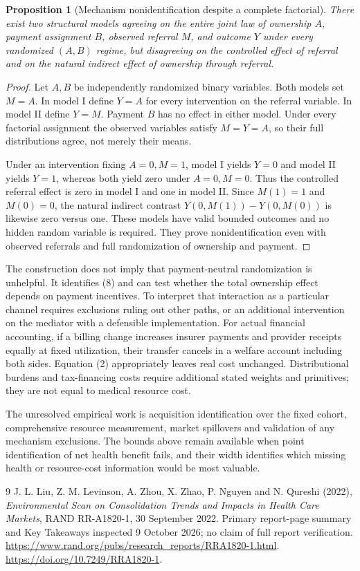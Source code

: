 \documentclass[11pt]{article}
\newtheorem{proposition}[theorem]{Proposition}
\theoremstyle{remark}
\begin{document}
\begin{proposition}[Mechanism nonidentification despite a complete factorial]
There exist two structural models agreeing on the entire joint law of ownership $A$, payment assignment $B$, observed referral $M$, and outcome $Y$ under every randomized $(A,B)$ regime, but disagreeing on the controlled effect of referral and on the natural indirect effect of ownership through referral.
\end{proposition}
\begin{proof}
Let $A,B$ be independently randomized binary variables. Both models set $M=A$. In model I define $Y=A$ for every intervention on the referral variable. In model II define $Y=M$. Payment $B$ has no effect in either model. Under every factorial assignment the observed variables satisfy $M=Y=A$, so their full distributions agree, not merely their means.

Under an intervention fixing $A=0,M=1$, model I yields $Y=0$ and model II yields $Y=1$, whereas both yield zero under $A=0,M=0$. Thus the controlled referral effect is zero in model I and one in model II. Since $M(1)=1$ and $M(0)=0$, the natural indirect contrast $Y(0,M(1))-Y(0,M(0))$ is likewise zero versus one. These models have valid bounded outcomes and no hidden random variable is required. They prove nonidentification even with observed referrals and full randomization of ownership and payment.
\end{proof}

The construction does not imply that payment-neutral randomization is unhelpful. It identifies (8) and can test whether the total ownership effect depends on payment incentives. To interpret that interaction as a particular channel requires exclusions ruling out other paths, or an additional intervention on the mediator with a defensible implementation. For actual financial accounting, if a billing change increases insurer payments and provider receipts equally at fixed utilization, their transfer cancels in a welfare account including both sides. Equation (2) appropriately leaves real cost unchanged. Distributional burdens and tax-financing costs require additional stated weights and primitives; they are not equal to medical resource cost.

The unresolved empirical work is acquisition identification over the fixed cohort, comprehensive resource measurement, market spillovers and validation of any mechanism exclusions. The bounds above remain available when point identification of net health benefit fails, and their width identifies which missing health or resource-cost information would be most valuable.

\begin{thebibliography}{9}
 J. L. Liu, Z. M. Levinson, A. Zhou, X. Zhao, P. Nguyen and N. Qureshi (2022), \emph{Environmental Scan on Consolidation Trends and Impacts in Health Care Markets}, RAND RR-A1820-1, 30 September 2022. Primary report-page summary and Key Takeaways inspected 9 October 2026; no claim of full report verification. \url{https://www.rand.org/pubs/research_reports/RRA1820-1.html}. \url{https://doi.org/10.7249/RRA1820-1}.
\end{thebibliography}
\end{document}
